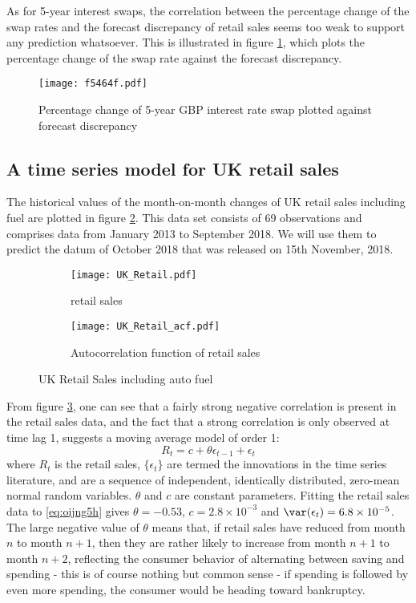 \documentclass[a4paper,11pt,pdftex,twoside,titlepage]{article}
\begin{document}
As for 5-year interest swaps, the correlation between the percentage
change of the swap rates and the forecast discrepancy of retail sales
seems too weak to support any prediction whatsoever. This is
illustrated in figure \ref{fig:f5464f}, which plots the percentage
change of the swap rate against the forecast discrepancy.
\begin{figure}[htb!]
  \centering
  \texttt{[image: f5464f.pdf]}
  \caption{Percentage change of 5-year GBP interest rate swap plotted
    against forecast discrepancy}
  \label{fig:f5464f}
\end{figure}

\subsection{A time series model for UK retail sales}
\label{sec:rg45yv67}
The historical values of the month-on-month changes of UK retail sales
including fuel are plotted in figure \ref{fig:4g56hf}. This data set
consists of 69 observations and comprises data from January 2013 to
September 2018. We will use them to predict the datum of October 2018
that was released on 15th November, 2018.
\begin{figure}[htb!]
  \centering
  \begin{subfigure}[b]{0.45\textwidth}
    \texttt{[image: UK\_Retail.pdf]}
    \caption{retail sales}
    \label{fig:4g56hf}
  \end{subfigure}
  \begin{subfigure}[b]{0.45\textwidth}
    \texttt{[image: UK\_Retail\_acf.pdf]}
    \caption{Autocorrelation function of retail sales}
    \label{fig:45gt5yh}
  \end{subfigure}
  \caption{UK Retail Sales including auto fuel}
  \label{dig:5g6yjh}
\end{figure}
From figure \ref{fig:45gt5yh}, one can see that a fairly strong
negative correlation is present in the retail sales data, and the fact
that a strong correlation is only observed at time lag 1, suggests a
moving average model of order 1:
\begin{equation}
  \label{eq:oijng5h}
  R_t = c + \theta \epsilon_{t-1} + \epsilon_{t}  
\end{equation}
where $R_t$ is the retail sales, $\{\epsilon_t\}$ are termed the
innovations in the time series literature, and are a sequence of 
independent, identically distributed, zero-mean normal random
variables. $\theta$ and $c$ are constant parameters. Fitting
the retail sales data to \eqref{eq:oijng5h} gives $\theta = -0.53$,
$c = 2.8 \times 10^{-3}$ and $\var(\epsilon_t) = 6.8 \times 10^{-5}$.
The large negative value of $\theta$ means that, if retail sales have
reduced from month $n$ to month $n+1$, then they are rather likely to
increase from month $n+1$ to month $n+2$, reflecting the consumer
behavior of alternating between saving and spending - this is of
course nothing but common sense - if spending is followed by even more
spending, the consumer would be heading toward bankruptcy.
\end{document}

